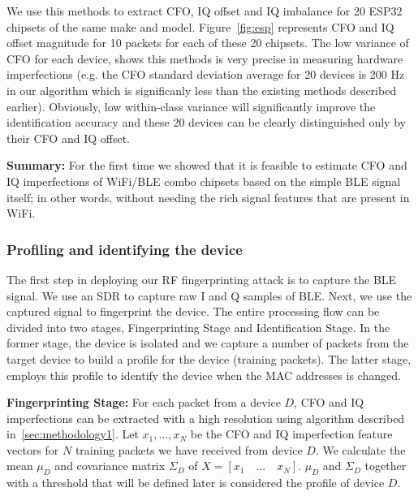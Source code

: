 We use this methods to extract CFO, IQ offset and IQ imbalance for 20 ESP32 chipsets of the same make and model. Figure~\ref{fig:esp} represents CFO and IQ offset magnitude for 10 packets for each of these 20 chipsets. The low variance of CFO for each device, shows this methods is very precise in measuring hardware imperfections (e.g. the CFO standard deviation average for 20 devices is 200 Hz in our algorithm which is significanly less than the existing methods described earlier). Obviously, low within-class variance will significantly improve the identification accuracy and these 20 devices can be clearly distinguished only by their CFO and IQ offset. 
\fi

\vspace{0.5em}
\noindent\textbf{Summary:} For the first time we showed that it is feasible to estimate CFO and IQ imperfections of WiFi/BLE combo chipsets based on the simple BLE signal itself; in other words, without needing the rich signal features that are present in WiFi.


\subsubsection{Profiling and identifying the device}
\label{sec:methodology2}

The first step in deploying our RF fingerprinting attack is to capture the BLE signal. We use an SDR to capture raw I and Q samples of BLE. Next, we use the captured signal to fingerprint the device. The entire processing flow can be divided into two stages, Fingerprinting Stage and Identification Stage. In the former stage, the device is isolated and we capture a number of packets from the target device to build a profile for the device (training packets). The latter stage, employs this profile to identify the device when the MAC addresses is changed.

\vspace{0.5em}
\noindent\textbf{Fingerprinting Stage:} For each packet from a device $D$, CFO and IQ imperfections can be extracted with a high resolution using algorithm described in~\ref{sec:methodology1}. Let $x_1,...,x_N$ be the CFO and IQ imperfection feature vectors for $N$ training packets we have received from device $D$. We calculate the mean $\mu_D$ and covariance matrix $\Sigma_D$ of $X = [x_1 \quad ... \quad x_N]$. $\mu_D$ and $\Sigma_D$ together with a threshold that will be defined later is considered the profile of device $D$.

